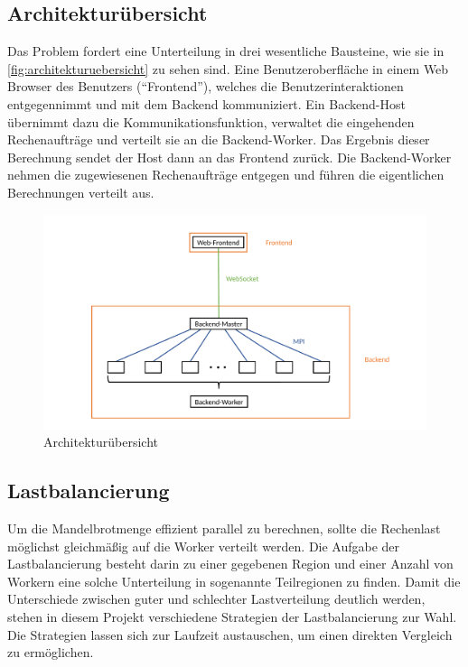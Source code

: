 \subsection{Architekturübersicht}
Das Problem fordert eine Unterteilung in drei wesentliche Bausteine, wie sie in \autoref{fig:architekturuebersicht} zu sehen sind.
Eine Benutzeroberfläche in einem Web Browser des Benutzers (“Frontend”), welches die Benutzerinteraktionen entgegennimmt und mit dem Backend kommuniziert.
Ein Backend-Host übernimmt dazu die Kommunikationsfunktion, verwaltet die eingehenden Rechenaufträge und verteilt sie an die Backend-Worker.
Das Ergebnis dieser Berechnung sendet der Host dann an das Frontend zurück.
Die Backend-Worker nehmen die zugewiesenen Rechenaufträge entgegen und führen die eigentlichen Berechnungen verteilt aus.

\begin{figure}
	\centering
	\includegraphics[width=0.98\linewidth]{img/Implementierung/Kommunikation.pdf}
	\caption{Architekturübersicht}
	\label{fig:architekturuebersicht}
\end{figure}

\subsection{Lastbalancierung}\label{sec:load_balancing_concepts}

Um die Mandelbrotmenge effizient parallel zu berechnen, sollte die Rechenlast möglichst gleichmäßig auf die Worker verteilt werden.
Die Aufgabe der Lastbalancierung besteht darin zu einer gegebenen Region und einer Anzahl von Workern eine solche Unterteilung in sogenannte Teilregionen zu finden.
Damit die Unterschiede zwischen guter und schlechter Lastverteilung deutlich werden, stehen in diesem Projekt verschiedene Strategien der Lastbalancierung zur Wahl.
Die Strategien lassen sich zur Laufzeit austauschen, um einen direkten Vergleich zu ermöglichen.

